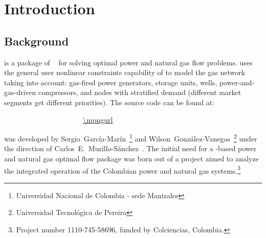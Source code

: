 \normalsize
{}
\setcounter{page}{1}

\chapter{Introduction}

\section{Background}

\mpng{} is a package of \matlab{}~\cite{zimmerman2011,matpower} for solving optimal power and natural gas flow problems. \mpng{} uses the general user nonlinear constraints capability of \matpower{} to model the gas network taking into account: gas-fired power generators, storage units, wells, power-and-gas-driven compressors, and nodes with stratified demand (different market segments get different priorities). The \mpng{} source code can be found at:

\bigskip
~~~~~~~~~~~~~~~~~~~~~~\url{\mpngurl}
\bigskip

\noindent \mpng{} was developed by Sergio~García-Marín~\footnote[1]{{\tiny Universidad Nacional de Colombia - sede Manizales\label{foot:UNAL}}} and Wilson~González-Vanegas~\footnote[2]{{\tiny Universidad Tecnológica de Pereira\label{foot:UTP}}} under the direction of Carlos~E.~Murillo-S\'anchez~. The initial need for a \matpower{}-based power and natural gas optimal flow package was born out of a project aimed to analyze the integrated operation of the Colombian power and natural gas systems.\footnote[3]{{\tiny Project number 1110-745-58696, funded by Colciencias, Colombia.}}